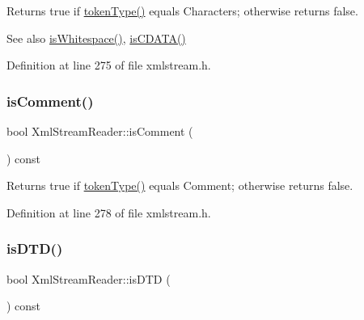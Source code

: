 Returns {\ttfamily true} if \hyperlink{class_xml_stream_reader_a2c26bfb63c27f2992e24f038d65c8c0a}{token\+Type()} equals  Characters; otherwise returns {\ttfamily false}.

\begin{DoxySeeAlso}{See also}
\hyperlink{class_xml_stream_reader_a15550b223a59978b612b0fc32bd543e1}{is\+Whitespace()}, \hyperlink{class_xml_stream_reader_ad1c5f23d9c60ab41c032940191d71ae4}{is\+C\+D\+A\+T\+A()} 
\end{DoxySeeAlso}


Definition at line 275 of file xmlstream.\+h.

\mbox{\label{class_xml_stream_reader_ac3c807c55b3a957da46fe7c695cd7907}} 
\subsubsection{\texorpdfstring{is\+Comment()}{isComment()}}
{\footnotesize\ttfamily bool Xml\+Stream\+Reader\+::is\+Comment (\begin{DoxyParamCaption}{ }\end{DoxyParamCaption}) const\hspace{0.3cm}{\ttfamily [inline]}}

Returns {\ttfamily true} if \hyperlink{class_xml_stream_reader_a2c26bfb63c27f2992e24f038d65c8c0a}{token\+Type()} equals  Comment; otherwise returns {\ttfamily false}. 

Definition at line 278 of file xmlstream.\+h.

\mbox{\label{class_xml_stream_reader_afd7dc97a37491da500428da151ca4913}} 
\subsubsection{\texorpdfstring{is\+D\+T\+D()}{isDTD()}}
{\footnotesize\ttfamily bool Xml\+Stream\+Reader\+::is\+D\+TD (\begin{DoxyParamCaption}{ }\end{DoxyParamCaption}) const\hspace{0.3cm}{\ttfamily [inline]}}


